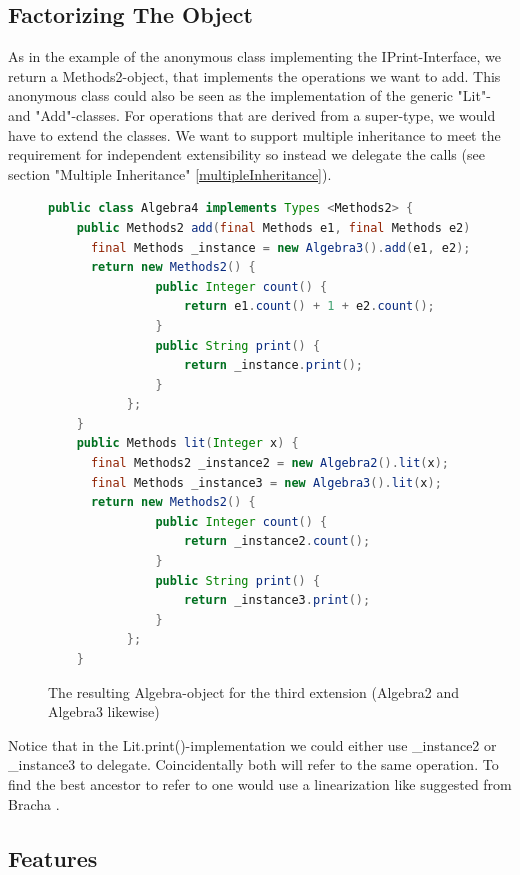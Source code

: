 \documentclass{report}
\begin{document}
\subsection{Factorizing The Object}

As in the example of the anonymous class implementing the IPrint-Interface, we return a Methods2-object, that implements the operations we want to add. This anonymous class could also be seen as the implementation of the generic "Lit"- and "Add"-classes. For operations that are derived from a super-type, we would have to extend the classes. We want to support multiple inheritance to meet the requirement for independent extensibility so instead we delegate the calls (see section "Multiple Inheritance" \ref{multipleInheritance}).

\begin{figure}[b]
\begin{lstlisting}[language=java]
public class Algebra4 implements Types <Methods2> {
    public Methods2 add(final Methods e1, final Methods e2) { 
      final Methods _instance = new Algebra3().add(e1, e2);
      return new Methods2() {
               public Integer count() {
                   return e1.count() + 1 + e2.count();
               }
               public String print() {
                   return _instance.print();
               }
           };
    }
    public Methods lit(Integer x) { 
      final Methods2 _instance2 = new Algebra2().lit(x);
      final Methods _instance3 = new Algebra3().lit(x);
      return new Methods2() {
               public Integer count() { 
                   return _instance2.count();
               }
               public String print() { 
                   return _instance3.print();
               }
           };
    }
\end{lstlisting}
\caption{The resulting Algebra-object for the third extension (Algebra2 and Algebra3 likewise)}
\label{algebraInterfaces}
\end{figure}

Notice that in the Lit.print()-implementation we could either use \_instance2 or \_instance3 to delegate. Coincidentally both will refer to the same operation. To find the best ancestor to refer to one would use a linearization like suggested from Bracha \cite{Bracha-Mixin-1990}.

\subsection{Features}
\end{document}
